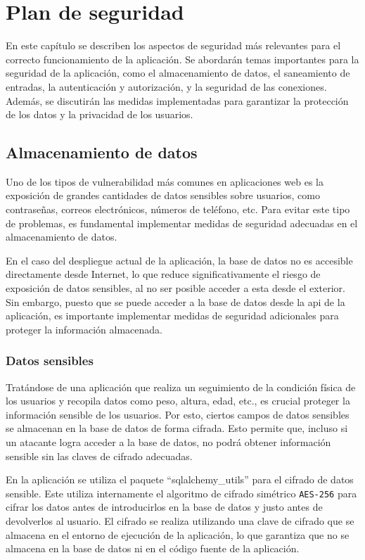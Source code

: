 \chapter{Plan de seguridad}
\label{anexo4:cap:seguridad}
En este capítulo se describen los aspectos de seguridad más relevantes para el correcto
funcionamiento de la aplicación. Se abordarán temas importantes para la seguridad de la aplicación,
como el almacenamiento de datos, el saneamiento de entradas, la autenticación y autorización, y
la seguridad de las conexiones. Además, se discutirán las medidas implementadas para garantizar la
protección de los datos y la privacidad de los usuarios.

\section{Almacenamiento de datos}
\label{anexo4:sec:almacenamiento}
Uno de los tipos de vulnerabilidad más comunes en aplicaciones web es la exposición de grandes
cantidades de datos sensibles sobre usuarios, como contraseñas, correos electrónicos, números de
teléfono, etc. Para evitar este tipo de problemas, es fundamental implementar medidas de seguridad
adecuadas en el almacenamiento de datos.

En el caso del despliegue actual de la aplicación, la base de datos no es accesible directamente desde
Internet, lo que reduce significativamente el riesgo de exposición de datos sensibles, al no ser posible
acceder a esta desde el exterior. Sin embargo, puesto que se puede acceder a la base de datos desde la
\gls{api} de la aplicación, es importante implementar medidas de seguridad adicionales para proteger
la información almacenada.

\subsection{Datos sensibles}
\label{anexo4:sec:datos-sensibles}
Tratándose de una aplicación que realiza un seguimiento de la condición física de los usuarios y recopila
datos como peso, altura, edad, etc., es crucial proteger la información sensible de los usuarios. Por
esto, ciertos campos de datos sensibles se almacenan en la base de datos de forma cifrada. Esto permite
que, incluso si un atacante logra acceder a la base de datos, no podrá obtener información sensible
sin las claves de cifrado adecuadas.

En la aplicación se utiliza el paquete \enquote{sqlalchemy\_utils} para el cifrado de datos sensible. Este
utiliza internamente el algoritmo de cifrado simétrico \texttt{AES-256} para cifrar los datos antes de
introducirlos en la base de datos y justo antes de devolverlos al usuario. El cifrado se realiza
utilizando una clave de cifrado que se almacena en el entorno de ejecución de la aplicación, lo que
garantiza que no se almacena en la base de datos ni en el código fuente de la aplicación.

